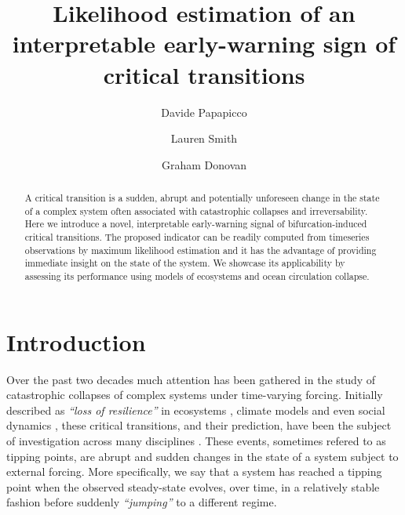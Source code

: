 \documentclass[10pt]{article}
\title{\textbf{Likelihood estimation of an interpretable early-warning sign of critical transitions}}
\author[1]{Davide Papapicco}
\author[1]{Lauren Smith}
\author[1]{Graham Donovan}
\affil[1]{Department of Mathematics, University of Auckland, New Zealand}
\date{}
\begin{document}
\maketitle

\begin{abstract}
        A critical transition is a sudden, abrupt and potentially unforeseen change in the state of a complex system often associated with catastrophic collapses and irreversability.
        Here we introduce a novel, interpretable early-warning signal of bifurcation-induced critical transitions.
        The proposed indicator can be readily computed from timeseries observations by maximum likelihood estimation and it has the advantage of providing immediate insight on the state of the system.
        We showcase its applicability by assessing its performance using models of ecosystems and ocean circulation collapse.
\end{abstract}

\section{Introduction}
Over the past two decades much attention has been gathered in the study of catastrophic collapses of complex systems under time-varying forcing.
Initially described as \textit{``loss of resilience''} in ecosystems \cite{Ives1995, Scheffer2009}, climate models \cite{Lenton2012} and even social dynamics \cite{Scheffer2021}, these critical transitions, and their prediction, have been the subject of investigation across many disciplines \cite{Feng2014,Liang2017,Xu2023}.
These events, sometimes refered to as tipping points, are abrupt and sudden changes in the state of a system subject to external forcing.
More specifically, we say that a system has reached a tipping point when the observed steady-state evolves, over time, in a relatively stable fashion before suddenly \textit{``jumping''} to a different regime.
\end{document}
